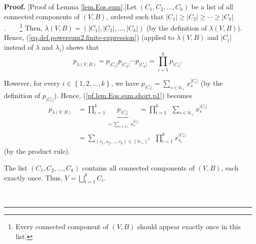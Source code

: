 \documentclass[numbers=enddot,12pt,final,onecolumn,notitlepage]{scrartcl}%
\theoremstyle{definition}
\newenvironment{proof}[1][Proof]{\noindent\textbf{#1.} }{\ \rule{0.5em}{0.5em}}
\newenvironment{vershort}{}{}
\let\sumnonlimits\sum
\let\prodnonlimits\prod
\renewcommand{\sum}{\sumnonlimits\limits}
\renewcommand{\prod}{\prodnonlimits\limits}
\begin{document}
\begin{vershort}
\begin{proof}
[Proof of Lemma \ref{lem.Eqs.sum}.]Let $\left(  C_{1},C_{2},\ldots
,C_{k}\right)  $ be a list of all connected components of $\left(  V,B\right)
$, ordered such that $\left\vert C_{1}\right\vert \geq\left\vert
C_{2}\right\vert \geq\cdots\geq\left\vert C_{k}\right\vert $%
.\ \ \ \ \footnote{Every connected component of $\left(  V,B\right)  $ should
appear exactly once in this list.} Then, $\lambda\left(  V,B\right)  =\left(
\left\vert C_{1}\right\vert ,\left\vert C_{2}\right\vert ,\ldots,\left\vert
C_{k}\right\vert \right)  $ (by the definition of $\lambda\left(  V,B\right)
$). Hence, (\ref{eq.def.powersum2.finite-expression}) (applied to
$\lambda\left(  V,B\right)  $ and $\left\vert C_{i}\right\vert $ instead of
$\lambda$ and $\lambda_{i}$) shows that{}%
\begin{equation}
p_{\lambda\left(  V,B\right)  }=p_{\left\vert C_{1}\right\vert }p_{\left\vert
C_{2}\right\vert }\cdots p_{\left\vert C_{k}\right\vert }=\prod_{i=1}%
^{k}p_{\left\vert C_{i}\right\vert }. \label{pf.lem.Eqs.sum.short.p1}%
\end{equation}


However, for every $i\in\left\{  1,2,\ldots,k\right\}  $, we have
$p_{\left\vert C_{i}\right\vert }=\sum_{s\in\mathbb{N}_{+}}x_{s}^{\left\vert
C_{i}\right\vert }$ (by the definition of $p_{\left\vert C_{i}\right\vert }$).
Hence, (\ref{pf.lem.Eqs.sum.short.p1}) becomes%
\begin{align}
p_{\lambda\left(  V,B\right)  }  &  =\prod_{i=1}^{k}\underbrace{p_{\left\vert
C_{i}\right\vert }}_{=\sum_{s\in\mathbb{N}_{+}}x_{s}^{\left\vert
C_{i}\right\vert }}=\prod_{i=1}^{k}\ \ \sum_{s\in\mathbb{N}_{+}}%
x_{s}^{\left\vert C_{i}\right\vert }\nonumber\\
&  =\sum_{\left(  s_{1},s_{2},\ldots,s_{k}\right)  \in\left(  \mathbb{N}%
_{+}\right)  ^{k}}\ \ \prod_{i=1}^{k}x_{s_{i}}^{\left\vert C_{i}\right\vert }
\label{pf.lem.Eqs.sum.short.p2}%
\end{align}
(by the product rule).

The list $\left(  C_{1},C_{2},\ldots,C_{k}\right)  $ contains all connected
components of $\left(  V,B\right)  $, each exactly once. Thus, $V=\bigsqcup
_{i=1}^{k}C_{i}$.


\end{proof}
\end{vershort}
\end{document}
